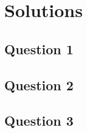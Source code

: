 \documentclass[a4paper,12pt]{article}
\begin{document}
\thispagestyle{empty}

\section{Solutions}
\thispagestyle{empty}
\subsection{Question 1}
\thispagestyle{empty}
\thispagestyle{empty}

\subsection{Question 2}
\thispagestyle{empty}
\thispagestyle{empty}

\subsection{Question 3}
\thispagestyle{empty}
\thispagestyle{empty}
\end{document}

